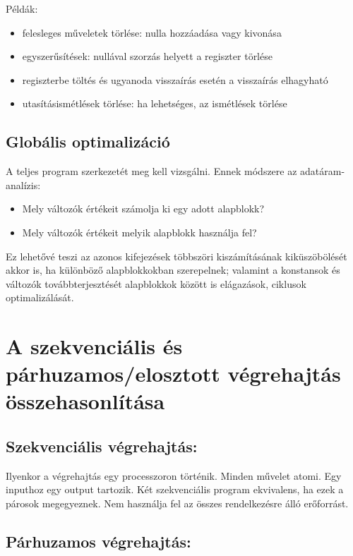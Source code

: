 \documentclass[margin=0px]{article}
\begin{document}
Példák:
\begin{itemize}
    \item
          felesleges műveletek törlése: nulla hozzáadása vagy kivonása
    \item
          egyszerűsítések: nullával szorzás helyett a regiszter törlése
    \item
          regiszterbe töltés és ugyanoda visszaírás esetén a visszaírás elhagyható
    \item
          utasításismétlések törlése: ha lehetséges, az ismétlések törlése
\end{itemize}


\subsection{Globális optimalizáció}
A teljes program szerkezetét meg kell vizsgálni. Ennek módszere az adatáram-analízis:
\begin{itemize}
    \item
          Mely változók értékeit számolja ki egy adott alapblokk?
    \item
          Mely változók értékeit melyik alapblokk használja fel?
\end{itemize}


Ez lehetővé teszi az azonos kifejezések többszöri kiszámításának kiküszöbölését akkor is, ha különböző alapblokkokban szerepelnek; valamint a konstansok és változók továbbterjesztését alapblokkok között is elágazások, ciklusok optimalizálását.

\section{A szekvenciális és	párhuzamos/elosztott végrehajtás összehasonlítása}

\subsection{Szekvenciális végrehajtás:}

Ilyenkor a végrehajtás egy processzoron történik. Minden művelet atomi. Egy inputhoz egy output tartozik. Két szekvenciális program ekvivalens, ha ezek a párosok megegyeznek. Nem használja fel az összes rendelkezésre álló erőforrást.


\subsection{Párhuzamos végrehajtás:}
\end{document}

